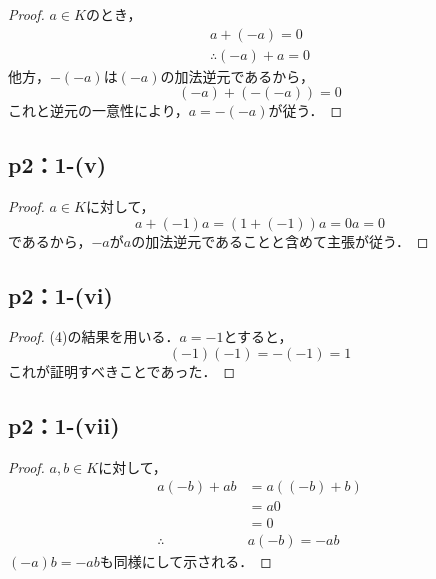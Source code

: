 \documentclass[a4paper,10pt,fleqn]{ltjsarticle}
\begin{document}
\begin{leftbar}
    \begin{proof}
        $a \in K$のとき，
        \begin{gather*}
            a+(-a)=0 \\
            \therefore (-a)+a =0
        \end{gather*}
        他方，$-(-a)$は$(-a)$の加法逆元であるから，
        \[
            (-a)+(-(-a))=0
        \]
        これと逆元の一意性により，$a=-(-a)$が従う．
    \end{proof}
\end{leftbar}

\subsection*{p2：1-(v)}
\begin{leftbar}
    \begin{proof}
        $a \in K$に対して，
        \[
            a+(-1)a=(1+(-1))a =0a =0
        \]
        であるから，$-a$が$a$の加法逆元であることと含めて主張が従う．
    \end{proof}
\end{leftbar}

\newpage

\subsection*{p2：1-(vi)}
\begin{leftbar}
    \begin{proof}
        (4)の結果を用いる．$a=-1$とすると，
        \[
            (-1)(-1)=-(-1)=1
        \]
        これが証明すべきことであった．
    \end{proof}
\end{leftbar}
\subsection*{p2：1-(vii)}

\begin{leftbar}
    \begin{proof}
        $a,b \in K$に対して，
        \begin{align*}
            a(-b)+ab         & = a((-b)+b) \\
                             & = a0        \\
                             & =0          \\
            \therefore \quad & a(-b)=-ab
        \end{align*}
        $(-a)b = -ab$も同様にして示される．
    \end{proof}
\end{leftbar}
\end{document}
